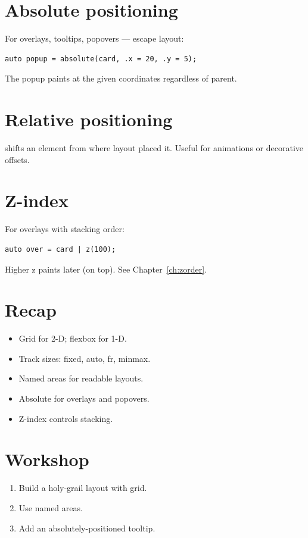 \section{Absolute positioning}

For overlays, tooltips, popovers --- escape layout:

\begin{lstlisting}
auto popup = absolute(card, .x = 20, .y = 5);
\end{lstlisting}

The popup paints at the given coordinates regardless of
parent.

\section{Relative positioning}

 shifts an element from where layout placed
it. Useful for animations or decorative offsets.

\section{Z-index}

For overlays with stacking order:

\begin{lstlisting}
auto over = card | z(100);
\end{lstlisting}

Higher z paints later (on top). See Chapter~\ref{ch:zorder}.

\section{Recap}

\begin{recap}
\begin{itemize}[leftmargin=*]
  \item Grid for 2-D; flexbox for 1-D.
  \item Track sizes: fixed, auto, fr, minmax.
  \item Named areas for readable layouts.
  \item Absolute for overlays and popovers.
  \item Z-index controls stacking.
\end{itemize}
\end{recap}

\section*{Workshop}

\begin{enumerate}[leftmargin=*]
  \item Build a holy-grail layout with grid.
  \item Use named areas.
  \item Add an absolutely-positioned tooltip.
\end{enumerate}
